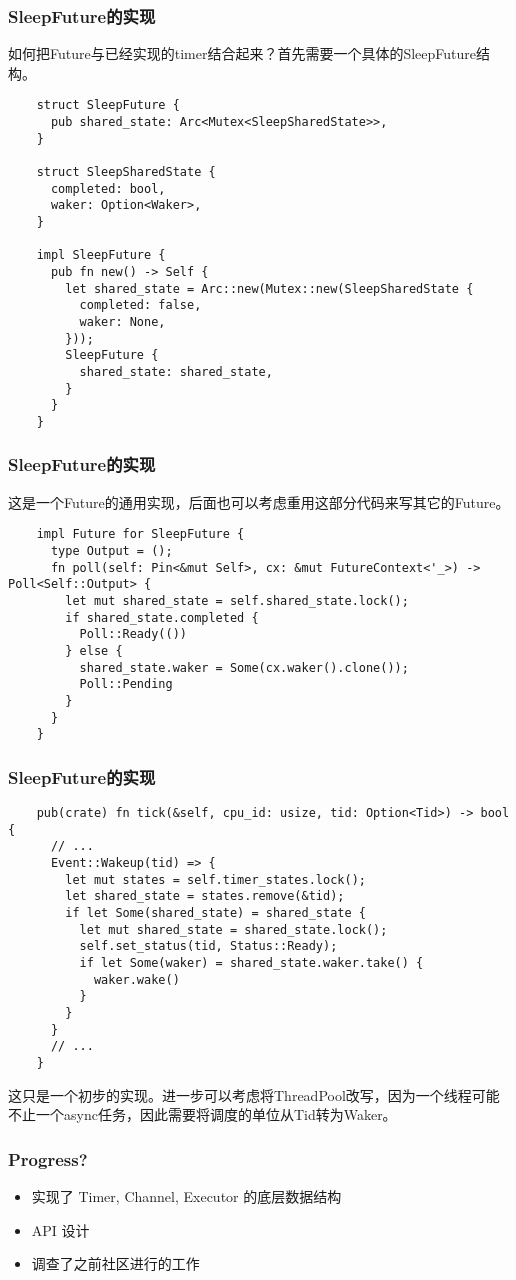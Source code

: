 \documentclass[UTF-8]{ctexbeamer}
\begin{document}
\begin{frame}[fragile]
  \frametitle{SleepFuture的实现}

  如何把Future与已经实现的timer结合起来？首先需要一个具体的SleepFuture结构。
  {
  \scriptsize
  \begin{verbatim}
    struct SleepFuture {
      pub shared_state: Arc<Mutex<SleepSharedState>>,
    }

    struct SleepSharedState {
      completed: bool,
      waker: Option<Waker>,
    }

    impl SleepFuture {
      pub fn new() -> Self {
        let shared_state = Arc::new(Mutex::new(SleepSharedState {
          completed: false,
          waker: None,
        }));
        SleepFuture {
          shared_state: shared_state,
        }
      }
    }
  \end{verbatim}
  }
\end{frame}

\begin{frame}[fragile]
  \frametitle{SleepFuture的实现}

  这是一个Future的通用实现，后面也可以考虑重用这部分代码来写其它的Future。
  {
  \scriptsize
  \begin{verbatim}
    impl Future for SleepFuture {
      type Output = ();
      fn poll(self: Pin<&mut Self>, cx: &mut FutureContext<'_>) -> Poll<Self::Output> {
        let mut shared_state = self.shared_state.lock();
        if shared_state.completed {
          Poll::Ready(())
        } else {
          shared_state.waker = Some(cx.waker().clone());
          Poll::Pending
        }
      }
    }    
  \end{verbatim}
  }
\end{frame}

\begin{frame}[fragile]
  \frametitle{SleepFuture的实现}

  {
    \scriptsize
    \begin{verbatim}
    pub(crate) fn tick(&self, cpu_id: usize, tid: Option<Tid>) -> bool {
      // ...
      Event::Wakeup(tid) => {
        let mut states = self.timer_states.lock();
        let shared_state = states.remove(&tid);
        if let Some(shared_state) = shared_state {
          let mut shared_state = shared_state.lock();
          self.set_status(tid, Status::Ready);
          if let Some(waker) = shared_state.waker.take() {
            waker.wake()
          }
        }
      }
      // ...
    }
  \end{verbatim}
  }

  这只是一个初步的实现。进一步可以考虑将ThreadPool改写，因为一个线程可能不止一个async任务，因此需要将调度的单位从Tid转为Waker。
\end{frame}

\begin{frame}
  \frametitle{Progress?}

  \begin{itemize}
    \item 实现了 Timer, Channel, Executor 的底层数据结构
    \item API 设计
    \item 调查了之前社区进行的工作
  \end{itemize}
\end{frame}
\end{document}
